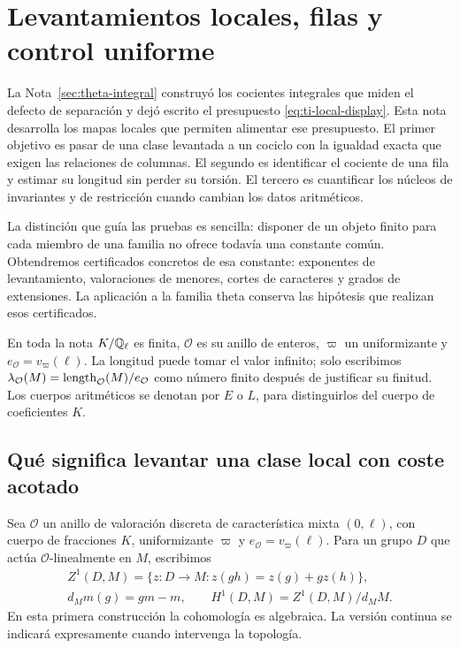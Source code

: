\section{Levantamientos locales, filas y control uniforme}
\label{sec:levantamientos-uniformes}


La Nota~\ref{sec:theta-integral} construyó los cocientes integrales
que miden el defecto de separación y dejó escrito el presupuesto
\eqref{eq:ti-local-display}. Esta nota desarrolla los mapas locales
que permiten alimentar ese presupuesto. El primer objetivo es
pasar de una clase levantada a un cociclo con la igualdad exacta
que exigen las relaciones de columnas. El segundo es identificar
el cociente de una fila y estimar su longitud sin perder su torsión.
El tercero es cuantificar los núcleos de invariantes y de
restricción cuando cambian los datos aritméticos.

La distinción que guía las pruebas es sencilla: disponer de un
objeto finito para cada miembro de una familia no ofrece todavía
una constante común. Obtendremos certificados concretos de esa
constante: exponentes de levantamiento, valoraciones de menores,
cortes de caracteres y grados de extensiones. La aplicación a la
familia theta conserva las hipótesis que realizan esos certificados.

En toda la nota $K/\mathbb{Q}_\ell$ es finita, $\mathcal O$ es su anillo
de enteros, $\varpi$ un uniformizante y
$e_{\mathcal O}=v_\varpi(\ell)$. La longitud puede tomar el valor
infinito; solo escribimos
$\lambda_{\mathcal O}(M)=\operatorname{length}_{\mathcal O}(M)/e_{\mathcal O}$
como número finito después de justificar su finitud. Los cuerpos
aritméticos se denotan por $E$ o $L$, para distinguirlos del
cuerpo de coeficientes $K$.

\subsection{Qué significa levantar una clase local con coste acotado}
\label{subsec:pl-levantar}

Sea $\mathcal O$ un anillo de valoración discreta de característica
mixta $(0,\ell)$, con cuerpo de fracciones $K$, uniformizante
$\varpi$ y $e_{\mathcal O}=v_\varpi(\ell)$. Para un grupo $D$ que
actúa $\mathcal O$-linealmente en $M$, escribimos
\[
 \begin{gathered}
 Z^1(D,M)=\{z:D\to M:z(gh)=z(g)+g z(h)\},\\
 d_Mm(g)=gm-m,\qquad H^1(D,M)=Z^1(D,M)/d_MM.
 \end{gathered}
\]
En esta primera construcción la cohomología es algebraica. La versión
continua se indicará expresamente cuando intervenga la topología.

